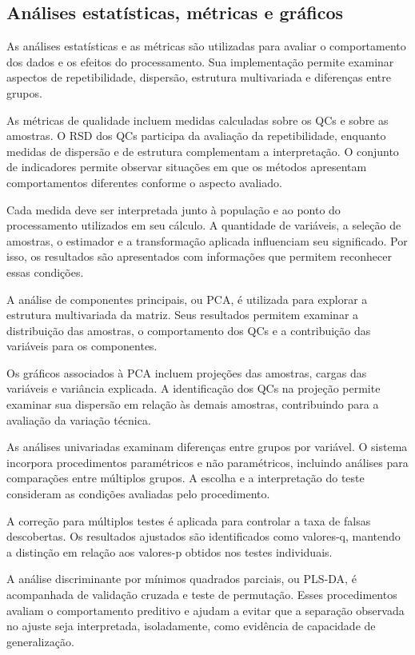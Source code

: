 \subsection{Análises estatísticas, métricas e gráficos}
\label{subsec:analises-metricas-graficos}

As análises estatísticas e as métricas são utilizadas para avaliar o comportamento dos dados e os efeitos do processamento. Sua implementação permite examinar aspectos de repetibilidade, dispersão, estrutura multivariada e diferenças entre grupos.

As métricas de qualidade incluem medidas calculadas sobre os QCs e sobre as amostras. O RSD dos QCs participa da avaliação da repetibilidade, enquanto medidas de dispersão e de estrutura complementam a interpretação. O conjunto de indicadores permite observar situações em que os métodos apresentam comportamentos diferentes conforme o aspecto avaliado.

Cada medida deve ser interpretada junto à população e ao ponto do processamento utilizados em seu cálculo. A quantidade de variáveis, a seleção de amostras, o estimador e a transformação aplicada influenciam seu significado. Por isso, os resultados são apresentados com informações que permitem reconhecer essas condições.

A análise de componentes principais, ou PCA, é utilizada para explorar a estrutura multivariada da matriz. Seus resultados permitem examinar a distribuição das amostras, o comportamento dos QCs e a contribuição das variáveis para os componentes.

Os gráficos associados à PCA incluem projeções das amostras, cargas das variáveis e variância explicada. A identificação dos QCs na projeção permite examinar sua dispersão em relação às demais amostras, contribuindo para a avaliação da variação técnica.

As análises univariadas examinam diferenças entre grupos por variável. O sistema incorpora procedimentos paramétricos e não paramétricos, incluindo análises para comparações entre múltiplos grupos. A escolha e a interpretação do teste consideram as condições avaliadas pelo procedimento.

A correção para múltiplos testes é aplicada para controlar a taxa de falsas descobertas. Os resultados ajustados são identificados como valores-q, mantendo a distinção em relação aos valores-p obtidos nos testes individuais.

A análise discriminante por mínimos quadrados parciais, ou PLS-DA, é acompanhada de validação cruzada e teste de permutação. Esses procedimentos avaliam o comportamento preditivo e ajudam a evitar que a separação observada no ajuste seja interpretada, isoladamente, como evidência de capacidade de generalização.

